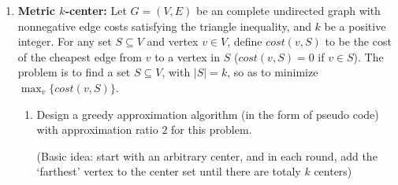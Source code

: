 \documentclass[12pt,a4paper]{article}
\theoremstyle{definition}
\begin{document}
\begin{enumerate}
    \item
    \textbf{Metric $k$-center:} Let $G = (V, E)$ be an complete undirected graph with nonnegative edge costs satisfying the triangle inequality, and $k$ be a positive integer. For any set $S \subseteq V$ and vertex $v \in V$, define $cost(v,S)$ to be the cost of the cheapest edge from $v$ to a vertex in $S$ ($cost(v, S) = 0$ if $v \in S$). The problem is to find a set $S \subseteq V$, with $|S| = k$, so as to minimize $\max_v\{cost(v, S)\}$.

    \begin{enumerate}
        \item
        Design a greedy approximation algorithm (in the form of pseudo code) with approximation ratio $2$ for this problem.

        (Basic idea: start with an arbitrary center, and in each round, add the `farthest' vertex to the center set until there are totaly $k$ centers)


\end{enumerate}
\end{enumerate}
\end{document}
